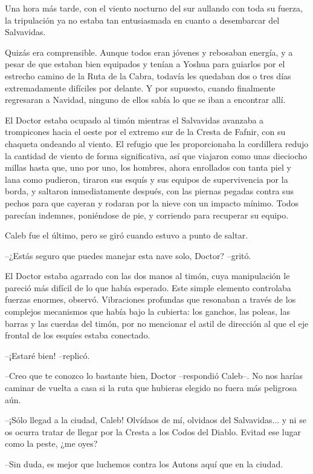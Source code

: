 Una hora más tarde, con el viento nocturno del sur aullando con toda su fuerza, la tripulación ya no estaba tan entusiasmada en cuanto a desembarcar del Salvavidas.
 
Quizás era comprensible. Aunque todos eran jóvenes y rebosaban energía, y a pesar de que estaban bien equipados y tenían a Yoshua para guiarlos por el estrecho camino de la Ruta de la Cabra, todavía les quedaban dos o tres días extremadamente difíciles por delante. Y por supuesto, cuando finalmente regresaran a Navidad, ninguno de ellos sabía lo que se iban a encontrar allí.
 
El Doctor estaba ocupado al timón mientras el Salvavidas avanzaba a trompicones hacia el oeste por el extremo sur de la Cresta de Fafnir, con su chaqueta ondeando al viento. El refugio que les proporcionaba la cordillera redujo la cantidad de viento de forma significativa, así que viajaron como unas dieciocho millas hasta que, uno por uno, los hombres, ahora enrollados con tanta piel y lana como pudieron, tiraron sus esquís y sus equipos de supervivencia por la borda, y saltaron inmediatamente después, con las piernas pegadas contra sus pechos para que cayeran y rodaran por la nieve con un impacto mínimo. Todos parecían indemnes, poniéndose de pie, y corriendo para recuperar su equipo.
 
Caleb fue el último, pero se giró cuando estuvo a punto de saltar.
 
--¿Estás seguro que puedes manejar esta nave solo, Doctor? --gritó.
 
El Doctor estaba agarrado con las dos manos al timón, cuya manipulación le pareció más difícil de lo que había esperado. Este simple elemento controlaba fuerzas enormes, observó. Vibraciones profundas que resonaban a través de los complejos mecanismos que había bajo la cubierta: los ganchos, las poleas, las barras y las cuerdas del timón, por no mencionar el astil de dirección al que el eje frontal de los esquíes estaba conectado.
 
--¡Estaré bien! --replicó.
 
--Creo que te conozco lo bastante bien, Doctor --respondió Caleb--. No nos harías caminar de vuelta a casa si la ruta que hubieras elegido no fuera más peligrosa aún.
 
--¡Sólo llegad a la ciudad, Caleb! Olvídaos de mí, olvidaos del Salvavidas... y ni se os ocurra tratar de llegar por la Cresta a los Codos del Diablo. Evitad ese lugar como la peste, ¿me oyes?
 
--Sin duda, es mejor que luchemos contra los Autons aquí que en la ciudad.
 
